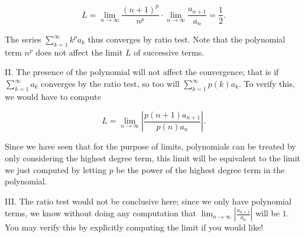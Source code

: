 \documentclass[noauthor]{ximera}
\begin{document}
\begin{problem}
\begin{freeResponse}
\[
L = \lim_{n \to \infty} \frac{(n+1)^p}{n^p} \cdot \lim_{n \to \infty} \frac{a_{n+1}}{a_n} = \frac{1}{2}.
\]

The series $\sum_{k=1}^{\infty} k^p a_k$ thus converges by ratio test.  Note that the polynomial term $n^p$ does not affect the limit $L$ of successive terms.

II. The presence of the polynomial will not affect the convergence; that is if  $\sum_{k=1}^{\infty} a_k$ converges by the ratio test, so too will $\sum_{k=1}^{\infty} p(k) a_k$.  To verify this, we would have to compute 

\[
L = \lim_{n \to \infty} \left|\frac{p(n+1)a_{n+1}}{p(n)a_n}\right| .
\]

Since we have seen that for the purpose of limits, polynomials can be treated by only considering the highest degree term, this limit will be equivalent to the limit we just computed by letting $p$ be the power of the highest degree term in the polynomial.

III. The ratio test would not be conclusive here; since we only have polynomial terms, we know without doing any computation that $\lim_{n \to \infty} \left|\frac{a_{n+1}}{a_n}\right|$ will be $1$.  You may verify this by explicitly computing the limit if you would like!

\end{freeResponse}
\end{problem}
\end{document}

